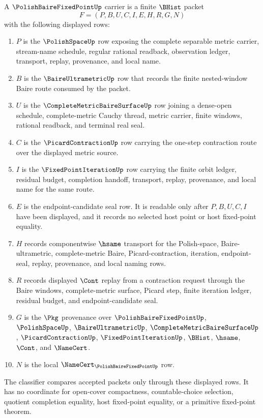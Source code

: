 \begin{definition}
\label{def:polish-baire-fixed-point-carrier}
A $\PolishBaireFixedPointUp$ carrier is a finite $\BHist$ packet
$$
F=(P,B,U,C,I,E,H,R,G,N)
$$
with the following displayed rows:
\begin{enumerate}
\item $P$ is the $\PolishSpaceUp$ row exposing the complete separable metric carrier, stream-name schedule, regular rational readback, observation ledger, transport, replay, provenance, and local name.
\item $B$ is the $\BaireUltrametricUp$ row that records the finite nested-window Baire route consumed by the packet.
\item $U$ is the $\CompleteMetricBaireSurfaceUp$ row joining a dense-open schedule, complete-metric Cauchy thread, metric carrier, finite windows, rational readback, and terminal real seal.
\item $C$ is the $\PicardContractionUp$ row carrying the one-step contraction route over the displayed metric source.
\item $I$ is the $\FixedPointIterationUp$ row carrying the finite orbit ledger, residual budget, completion handoff, transport, replay, provenance, and local name for the same route.
\item $E$ is the endpoint-candidate seal row. It is readable only after $P,B,U,C,I$ have been displayed, and it records no selected host point or host fixed-point equality.
\item $H$ records componentwise $\hsame$ transport for the Polish-space, Baire-ultrametric, complete-metric Baire, Picard-contraction, iteration, endpoint-seal, replay, provenance, and local naming rows.
\item $R$ records displayed $\Cont$ replay from a contraction request through the Baire windows, complete-metric surface, Picard step, finite iteration ledger, residual budget, and endpoint-candidate seal.
\item $G$ is the $\Pkg$ provenance over $\PolishBaireFixedPointUp$, $\PolishSpaceUp$, $\BaireUltrametricUp$, $\CompleteMetricBaireSurfaceUp$, $\PicardContractionUp$, $\FixedPointIterationUp$, $\BHist$, $\hsame$, $\Cont$, and $\NameCert$.
\item $N$ is the local $\NameCert_{\PolishBaireFixedPointUp}$ row.
\end{enumerate}
The classifier compares accepted packets only through these displayed rows. It has no coordinate for open-cover compactness, countable-choice selection, quotient completion equality, host fixed-point equality, or a primitive fixed-point theorem.
\end{definition}

